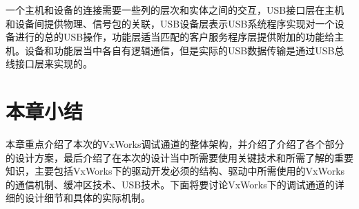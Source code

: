 	一个主机和设备的连接需要一些列的层次和实体之间的交互，USB接口层在主机和设备间提供物理、信号包的关联，USB设备层表示USB系统程序实现对一个设备进行的总的USB操作，功能层适当匹配的客户服务程序层提供附加的功能给主机。设备和功能层当中各自有逻辑通信，但是实际的USB数据传输是通过USB总线接口层来实现的\cite{USB开发手册}\cite{圈圈教你玩USB}。


\section{本章小结}
	本章重点介绍了本次的VxWorks调试通道的整体架构，并介绍了介绍了各个部分的设计方案，最后介绍了在本次的设计当中所需要使用关键技术和所需了解的重要知识，主要包括VxWorks下的驱动开发必须的结构、驱动中所需使用的VxWorks的通信机制、缓冲区技术、USB技术。下面将要讨论VxWorks下的调试通道的详细的设计细节和具体的实际机制。

























